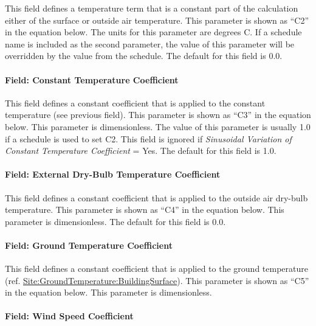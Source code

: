 This field defines a temperature term that is a constant part of the calculation either of the surface or outside air temperature. This parameter is shown as ``C2'' in the equation below. The units for this parameter are degrees C. If a schedule name is included as the second parameter, the value of this parameter will be overridden by the value from the schedule. The default for this field is 0.0.

\paragraph{Field: Constant Temperature Coefficient}\label{field-constant-temperature-coefficient}

This field defines a constant coefficient that is applied to the constant temperature (see previous field). This parameter is shown as ``C3'' in the equation below. This parameter is dimensionless. The value of this parameter is usually 1.0 if a schedule is used to set C2. This field is ignored if \emph{Sinusoidal Variation of Constant Temperature Coefficient} = Yes. The default for this field is 1.0.

\paragraph{Field: External Dry-Bulb Temperature Coefficient}\label{field-external-dry-bulb-temperature-coefficient}

This field defines a constant coefficient that is applied to the outside air dry-bulb temperature. This parameter is shown as ``C4'' in the equation below. This parameter is dimensionless. The default for this field is 0.0.

\paragraph{Field: Ground Temperature Coefficient}\label{field-ground-temperature-coefficient}

This field defines a constant coefficient that is applied to the ground temperature (ref. \hyperref[sitegroundtemperaturebuildingsurface]{Site:GroundTemperature:BuildingSurface}). This parameter is shown as ``C5'' in the equation below. This parameter is dimensionless.

\paragraph{Field: Wind Speed Coefficient}\label{field-wind-speed-coefficient}


